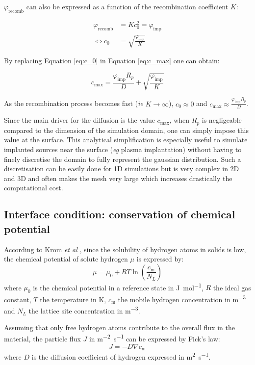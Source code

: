 $\varphi_\mathrm{recomb}$ can also be expressed as a function of the recombination coefficient $K$:

\begin{eqnarray}
    \varphi_\mathrm{recomb} &= K c_{0}^{2} = \varphi_\mathrm{imp}\\
    \Leftrightarrow c_{0} &= \sqrt{\frac{\varphi_\mathrm{imp}}{K}}
    \label{eq:c_0}
\end{eqnarray}

By replacing Equation \ref{eq:c_0} in Equation \ref{eq:c_max} one can obtain:

\begin{equation}
    c_\mathrm{max} = \frac{\varphi_\mathrm{imp} R_{p}}{D}+\sqrt{\frac{\varphi_\mathrm{imp}}{K}}
\end{equation}

As the recombination process becomes fast (\textit{ie} $K \rightarrow \infty$), $c_0 \approx 0$ and $c_\mathrm{max} \approx \frac{\varphi_\mathrm{imp} R_{p}}{D}$.

Since the main driver for the diffusion is the value $c_\mathrm{max}$, when $R_p$ is negligeable compared to the dimension of the simulation domain, one can simply impose this value at the surface.
This analytical simplification is especially useful to simulate implanted sources near the surface (\textit{eg} plasma implantation) without having to finely discretise the domain to fully represent the gaussian distribution.
Such a discretisation can be easily done for 1D simulations but is very complex in 2D and 3D and often makes the mesh very large which increases drastically the computational cost.


\subsection{Interface condition: conservation of chemical potential}
According to Krom \textit{et al} , since the solubility of hydrogen atoms in solids is low, the chemical potential of solute hydrogen $\mu$ is expressed by:
\begin{equation}
    \mu = \mu_0 + RT \ln\left( \frac{c_\mathrm{m}}{N_L}\right)
\end{equation}
where $\mu_0$ is the chemical potential in a reference state in \si{J.mol^{-1}}, $R$ the ideal gas constant, $T$ the temperature in \si{K}, $c_\mathrm{m}$ the mobile hydrogen concentration in \si{m^{-3}} and $N_L$ the lattice site concentration in \si{m^{-3}}.

Assuming that only free hydrogen atoms contribute to the overall flux in the material, the particle flux $J$ in \si{m^{-2}.s^{-1}} can be expressed by Fick's law:
\begin{equation}
    J = - D \nabla c_\mathrm{m}
\end{equation}
where $D$ is the diffusion coefficient of hydrogen expressed in \si{m^{2}.s^{-1}}. 


